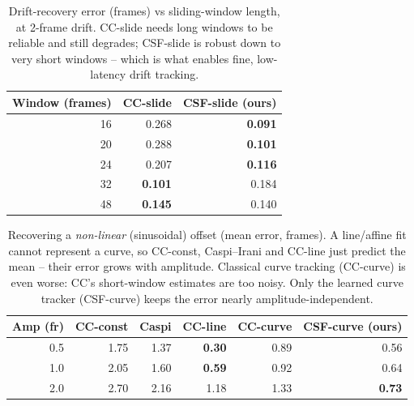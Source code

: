 \begin{table}[t]
\centering
\caption{Drift-recovery error (frames) vs sliding-window length, at 2-frame drift.
CC-slide needs long windows to be reliable and still degrades; CSF-slide is robust
down to very short windows -- which is what enables fine, low-latency drift tracking.}
\label{tab:b3_window}
\begin{tabular}{rrr}
\toprule
Window (frames) & CC-slide & \textbf{CSF-slide (ours)} \\
\midrule
16 & 0.268 & \textbf{0.091} \\
20 & 0.288 & \textbf{0.101} \\
24 & 0.207 & \textbf{0.116} \\
32 & \textbf{0.101} & 0.184 \\
48 & \textbf{0.145} & 0.140 \\
\bottomrule
\end{tabular}
\end{table}

\begin{table}[t]
\centering
\caption{Recovering a \emph{non-linear} (sinusoidal) offset (mean error, frames).
A line/affine fit cannot represent a curve, so CC-const, Caspi--Irani and CC-line
just predict the mean -- their error grows with amplitude. Classical curve tracking
(CC-curve) is even worse: CC's short-window estimates are too noisy. Only the learned
curve tracker (CSF-curve) keeps the error nearly amplitude-independent.}
\label{tab:b3_nonlinear}
\begin{tabular}{rrrrrr}
\toprule
Amp (fr) & CC-const & Caspi & CC-line & CC-curve & \textbf{CSF-curve (ours)} \\
\midrule
0.5 & 1.75 & 1.37 & \textbf{0.30} & 0.89 & 0.56 \\
1.0 & 2.05 & 1.60 & \textbf{0.59} & 0.92 & 0.64 \\
2.0 & 2.70 & 2.16 & 1.18 & 1.33 & \textbf{0.73} \\
\bottomrule
\end{tabular}
\end{table}
